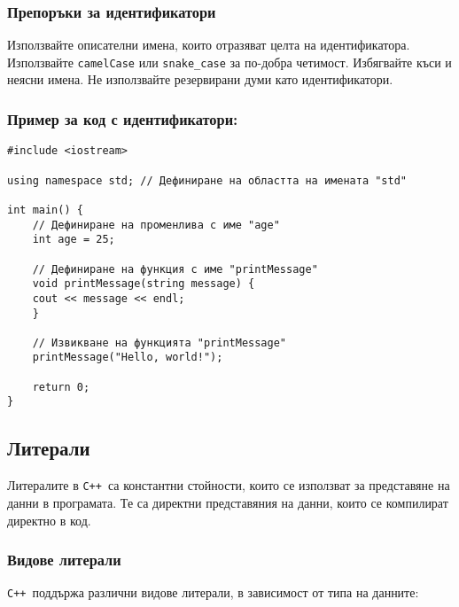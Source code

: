\documentclass[oneside]{book}
\newcommand*{\code}[1]{\texttt{#1}}
\newcommand*{\cpp}{\texttt{C++}\ }
\begin{document}
\subsubsection{Препоръки за идентификатори}
Използвайте описателни имена, които отразяват целта на идентификатора. Използвайте \code{camelCase} или \code{snake\_case} за по-добра четимост.
Избягвайте къси и неясни имена. Не използвайте резервирани думи като идентификатори.

\subsubsection{Пример за код с идентификатори:}
\begin{mdframed}\begin{lstlisting}
#include <iostream>

using namespace std; // Дефиниране на областта на имената "std"

int main() {
    // Дефиниране на променлива с име "age"
    int age = 25;

    // Дефиниране на функция с име "printMessage"
    void printMessage(string message) {
    cout << message << endl;
    }

    // Извикване на функцията "printMessage"
    printMessage("Hello, world!");

    return 0;
}
\end{lstlisting}\end{mdframed}

\subsection{Литерали}
Литералите в \cpp са константни стойности, които се използват за представяне на данни в програмата. Те са директни представяния на данни, които се компилират директно в код.

\subsubsection{Видове литерали}
\cpp поддържа различни видове литерали, в зависимост от типа на данните:
\end{document}
